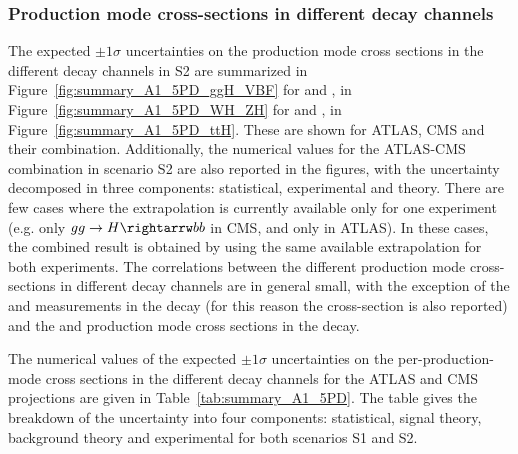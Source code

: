 \subsubsection{Production mode cross-sections in different decay channels}
\label{sec:expcomb_prodtimesdecay}
The expected $\pm 1\sigma$ uncertainties on the production mode cross sections in the different decay channels in S2 are summarized in Figure~\ref{fig:summary_A1_5PD_ggH_VBF} for \ggh and \vbf, in Figure~\ref{fig:summary_A1_5PD_WH_ZH} for \wh and \zh, in Figure~\ref{fig:summary_A1_5PD_ttH}. These are shown for ATLAS, CMS and their combination. Additionally, the numerical values for the ATLAS-CMS combination in scenario S2 are also reported in the figures, with the uncertainty decomposed in three components: statistical, experimental and theory.
There are few cases where the extrapolation is currently available only for one experiment (e.g. only $gg \rightarrow H \rightarrw bb$ in CMS, and only \hzg in ATLAS). In these cases, the combined result is obtained by using the same available extrapolation  for both experiments.
The correlations between the different production mode cross-sections in different decay channels are in general small, with the exception of the \zh and \wh measurements in the \hzz decay (for this reason the \vh cross-section is also reported) and the \ggh and \vbf production mode cross sections in the \hmm decay. 


The numerical values of the expected $\pm 1\sigma$ uncertainties on the per-production-mode cross sections in the different decay channels for the ATLAS and CMS projections are given in Table~\ref{tab:summary_A1_5PD}. The table  gives the breakdown of the uncertainty into four components: statistical, signal theory, background theory and experimental for both scenarios S1 and S2. 



